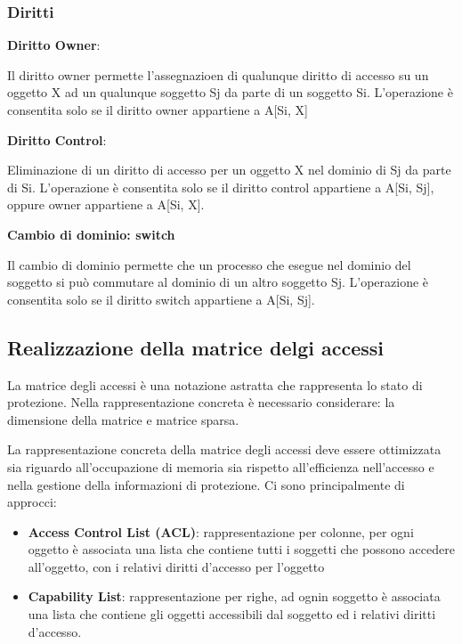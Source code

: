\documentclass{article}
\begin{document}
\vspace{3mm}
\subsubsection{Diritti}

\textbf{Diritto Owner}:
\vspace{3mm}

Il diritto owner permette l'assegnazioen di qualunque diritto di accesso su un oggetto X ad un qualunque soggetto Sj da parte di un soggetto Si. L'operazione è consentita solo
se il diritto owner appartiene a A[Si, X]

\vspace{3mm}
\textbf{Diritto Control}:
\vspace{3mm}

Eliminazione di un diritto di accesso per un oggetto X nel dominio di Sj da parte di Si. L'operazione è consentita solo se il diritto control appartiene a A[Si, Sj], oppure owner
appartiene a A[Si, X].

\vspace{3mm}
\textbf{Cambio di dominio: switch}
\vspace{3mm}

Il cambio di dominio permette che un processo che esegue nel dominio del soggetto si può commutare al dominio di un altro soggetto Sj.
L'operazione è consentita solo se il diritto switch appartiene a A[Si, Sj].

\subsection{Realizzazione della matrice delgi accessi}
La matrice degli accessi è una notazione astratta che rappresenta lo stato di protezione. Nella rappresentazione concreta è necessario considerare: la dimensione della matrice e matrice 
sparsa.

La rappresentazione concreta della matrice degli accessi deve essere ottimizzata sia riguardo all'occupazione di memoria sia rispetto all'efficienza nell'accesso e nella gestione della
informazioni di protezione.
Ci sono principalmente di approcci:
\begin{itemize}
    \item \textbf{Access Control List (ACL)}: rappresentazione per colonne, per ogni oggetto è associata una lista che contiene tutti i soggetti che possono accedere all'oggetto, con i relativi diritti
    d'accesso per l'oggetto
    \item \textbf{Capability List}: rappresentazione per righe, ad ognin soggetto è associata una lista che contiene gli oggetti accessibili dal soggetto ed i relativi diritti d'accesso.
\end{itemize}
\end{document}
